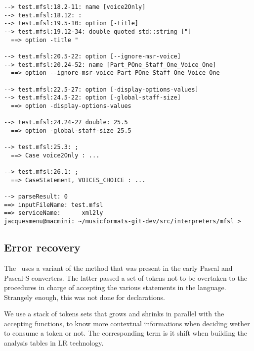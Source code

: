 \begin{lstlisting}[language=Terminal]
--> test.mfsl:18.2-11: name [voice2Only]
--> test.mfsl:18.12: :
--> test.mfsl:19.5-10: option [-title]
--> test.mfsl:19.12-34: double quoted std::string ["]
  ==> option -title "

--> test.mfsl:20.5-22: option [--ignore-msr-voice]
--> test.mfsl:20.24-52: name [Part_POne_Staff_One_Voice_One]
  ==> option --ignore-msr-voice Part_POne_Staff_One_Voice_One

--> test.mfsl:22.5-27: option [-display-options-values]
--> test.mfsl:24.5-22: option [-global-staff-size]
  ==> option -display-options-values

--> test.mfsl:24.24-27 double: 25.5
  ==> option -global-staff-size 25.5

--> test.mfsl:25.3: ;
  ==> Case voice2Only : ...

--> test.mfsl:26.1: ;
  ==> CaseStatement, VOICES_CHOICE : ...

--> parseResult: 0
==> inputFileName: test.mfsl
==> serviceName:      xml2ly
jacquesmenu@macmini: ~/musicformats-git-dev/src/interpreters/mfsl >
\end{lstlisting}


\subsection{Error recovery}

The \mfslInterp\ uses a variant of the  method that was present in the early Pascal and Pascal-S converters. The latter passed a set of tokens not to be overtaken to the procedures in charge of accepting the various statements in the language. Strangely enough, this was not done for declarations.

We use a stack of tokens sets that grows and shrinks in parallel with the accepting functions, to know more contextual informations when deciding wether to consume a token or not. The corresponding term is {it shift}
when building the analysis tables in LR technology.


